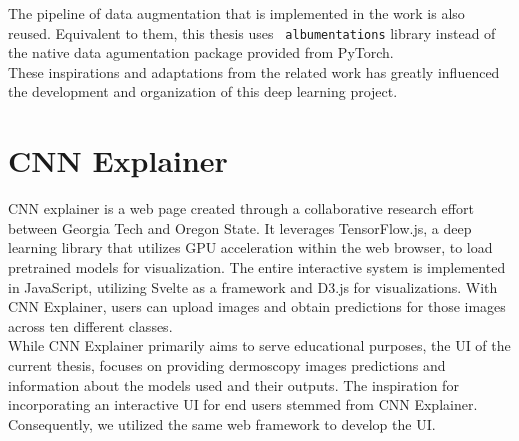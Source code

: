 The pipeline of data augmentation that is implemented in the work is also
reused. Equivalent to them, this thesis uses {\tt
albumentations}\cite{Albumentations} library instead of the native data
agumentation package provided from PyTorch. \\

These inspirations and adaptations from the related work has greatly influenced
the development and organization of this deep learning project.

\section{CNN Explainer}

CNN explainer is a web page created through a collaborative research effort
between Georgia Tech and Oregon State\cite{CNNExplainer}. It leverages
TensorFlow.js, a deep learning library that utilizes GPU acceleration within
the web browser, to load pretrained models for visualization. The entire
interactive system is implemented in JavaScript, utilizing Svelte as a
framework and D3.js for visualizations. With CNN Explainer, users can upload
images and obtain predictions for those images across ten different classes.
\\

While CNN Explainer primarily aims to serve educational purposes, the UI of the
current thesis, focuses on providing dermoscopy images predictions and
information about the models used and their outputs. The inspiration for
incorporating an interactive UI for end users stemmed from CNN Explainer.
Consequently, we utilized the same web framework to develop the UI.
